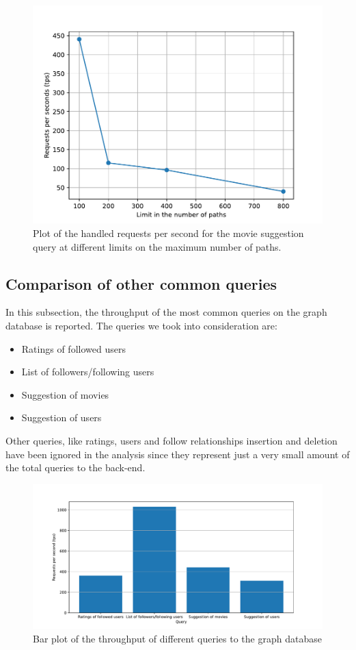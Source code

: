 \documentclass[11pt]{article}
\begin{document}
\begin{figure}[]
    \centering
    \includegraphics[width=\textwidth]{figs/tps_max_path.pdf}
    \caption{Plot of the handled requests per second for the movie suggestion query at different limits on the maximum number of paths.}
    \label{fig:tps_mp}
\end{figure}

\subsection{Comparison of other common queries}
In this subsection, the throughput of the most common queries on the graph 
database is reported. The queries we took into consideration are:
\begin{itemize}
    \item Ratings of followed users
    \item List of followers/following users
    \item Suggestion of movies
    \item Suggestion of users
\end{itemize}

Other queries, like ratings, users and follow relationships insertion and 
deletion have been ignored in the analysis since they represent just a very 
small amount of the total queries to the back-end.

\begin{figure}[]
    \centering
    \includegraphics[width=\textwidth]{figs/tps_query.pdf}
    \caption{Bar plot of the throughput of different queries to the graph database}
    \label{fig:queries-graph}
\end{figure}
\end{document}
